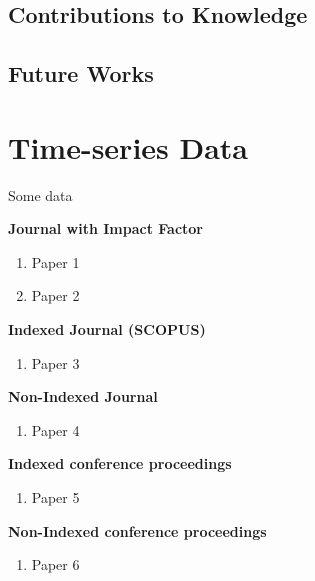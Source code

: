 \documentclass[oneside]{utmthesis}
\begin{document}
\section{Contributions to Knowledge}
\section{Future Works}

%



\appendix
\chapter{Time-series Data}
Some data

\listofpublications

\noindent \textbf{Journal with Impact Factor}
\begin{enumerate}
\item Paper 1
\item Paper 2
\end{enumerate}
\textbf{Indexed Journal (SCOPUS)}
\begin{enumerate}
\item Paper 3
\end{enumerate}
\noindent \textbf{Non-Indexed Journal}
\begin{enumerate}
\item Paper 4
\end{enumerate}
\noindent \textbf{Indexed conference proceedings}
\begin{enumerate}
\item Paper 5
\end{enumerate}
\noindent \textbf{Non-Indexed conference proceedings}
\begin{enumerate}
\item Paper 6
\end{enumerate}

\endmatter
\end{document}
